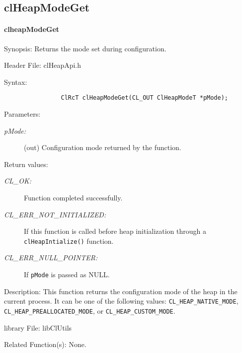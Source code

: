 \begin{flushleft}
\subsection{clHeapModeGet}
\hypertarget{pageheap108}{}\paragraph{cl\-heap\-Mode\-Get}\label{pageheap108}
\begin{Desc}
\item[Synopsis:]Returns the mode set during configuration. \end{Desc}
\begin{Desc}
\item[Header File:]clHeapApi.h\end{Desc}
\begin{Desc}
\item[Syntax:]
\footnotesize\begin{verbatim}
 				ClRcT clHeapModeGet(CL_OUT ClHeapModeT *pMode);
\end{verbatim}
\normalsize
\end{Desc}
\begin{Desc}
\item[Parameters:]
\begin{description}
\item[{\em p\-Mode:}](out) Configuration mode returned by the function.
\end{description}
\end{Desc}
\begin{Desc}
\item[Return values:]
\begin{description}
\item[{\em CL\_\-OK:}] Function completed successfully.
\item[{\em CL\_\-ERR\_\-NOT\_\-INITIALIZED:}] If this function is called before heap initialization through a {\tt{clHeapIntialize()}} function.
\item[{\em CL\_\-ERR\_\-NULL\_\-POINTER:}] If {\tt{pMode}} is passed as NULL.
\end{description}
\end{Desc}
\begin{Desc}
\item[Description:] This function returns the configuration mode of the heap in the current process. It can be one of the following values:
{\tt{CL\_\-HEAP\_\-NATIVE\_\-MODE}}, {\tt{CL\_\-HEAP\_\-PREALLOCATED\_\-MODE}}, or {\tt{CL\_\-HEAP\_\-CUSTOM\_\-MODE}}.
\end{Desc}
\begin{Desc}
\item[library File:]lib\-Cl\-Utils\end{Desc}
\begin{Desc}
\item[Related Function(s):]None. \end{Desc}
\newpage




\end{flushleft}
